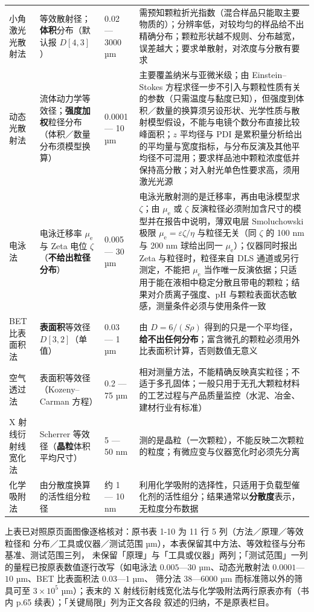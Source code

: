 {\begin{longtable}{@{}p{26mm}p{44mm}p{26mm}p{62mm}@{}}
小角激光光散射法 & 等效散射径；\textbf{体积}分布（默认报 $D[4,3]$） & 0.02 — 3000 µm & 需预知颗粒折光指数（混合样品只能取主要物质的）；分辨率低，对较均匀的样品给不出精确分布；颗粒形状越不规则、分布越宽，误差越大；要求单散射，对浓度与分散有要求 \\
动态光散射法 & 流体动力学等效径；\textbf{强度加权}粒径分布（体积／数量分布须模型换算） & 0.0001 — 10 µm & 主要覆盖纳米与亚微米级；由 Einstein--Stokes 方程求径一步不引入与颗粒性质有关的参数（只需温度与黏度已知），但强度到体积／数量的换算须另设形状、光学性质与散射模型假设，不能与电镜个数分布直接比较峰面积；$z$ 平均径与 PDI 是累积量分析给出的平均量与宽度指标，与分布反演及其他平均径不可混用；要求样品池中颗粒浓度低并保持高分散；对入射光单色性要求高，须用激光光源 \\
电泳法 & 电泳迁移率 $\mu_{\mathrm{e}}$ 与 Zeta 电位 $\zeta$（\textbf{不给出粒径分布}） & 0.005 — 30 µm & 电泳光散射测的是迁移率，再由电泳模型求 $\zeta$；由 $\mu_{\mathrm{e}}$ 或 $\zeta$ 反演粒径必须附加含尺寸的模型并在报告中说明，薄双电层 Smoluchowski 极限 $\mu_{\mathrm{e}}=\varepsilon\zeta/\eta$ 与粒径无关（同 $\zeta$ 的 100 nm 与 200 nm 球给出同一 $\mu_{\mathrm{e}}$）；仪器同时报出 Zeta 与粒径时，粒径来自 DLS 通道或另行测定，不能把 $\mu_{\mathrm{e}}$ 当作唯一反演依据；只适用于能在液相中稳定分散且带电的颗粒；结果对介质离子强度、pH 与颗粒表面状态敏感，测量条件必须与使用条件一致 \\
BET 比表面积法 & \textbf{表面积}等效径 $D[3,2]$（单值） & 0.03 — 1 µm & 由 $D=6/(S\rho)$ 得到的只是一个平均径，\textbf{给不出任何分布}；富含微孔的颗粒必须用外比表面积计算，否则数值无意义 \\
空气透过法 & 表面积等效径（Kozeny--Carman 方程） & 0.2 — 75 µm & 相对测量方法，不能精确反映真实粒径；不适于多孔固体；一般只用于无孔大颗粒材料的工艺过程与产品质量监控（水泥、冶金、建材行业有标准） \\
X 射线衍射线宽化法 & Scherrer 等效径（\textbf{晶粒}体积平均尺寸） & 5 — 50 nm & 测的是晶粒（一次颗粒），不能反映二次颗粒的粒度；有微应变与仪器宽化时必须先分离 \\
化学吸附法 & 由分散度换算的活性组分粒径 & 约 1 — 10 nm & 利用化学吸附的选择性，只适用于负载型催化剂的活性组分；结果通常以\textbf{分散度}表示，无粒度分布数据 \\
\end{longtable}}

\noindent 上表已对照原页面图像逐格核对：原书表 1-10 为 11 行 5 列（方法／原理／等效粒径和
分布／工具或仪器／测试范围 µm），本表保留其中方法、等效粒径与分布基准、测试范围三列，
未保留「原理」与「工具或仪器」两列；「测试范围」一列的量程已按原表数值逐行改写（如电泳法
$0.005$—$30$ µm、动态光散射法 $0.0001$—$10$ µm、BET 比表面积法 $0.03$—$1$ µm、
筛分法 $38$—$6000$ µm 而标准筛以外的筛具可至 $3\times10^{5}$ µm）；表末的
X 射线衍射线宽化法与化学吸附法两行原表亦有（书内 p.65 续表）；「关键局限」列为正文各段
叙述的归纳，不是原表栏目。

